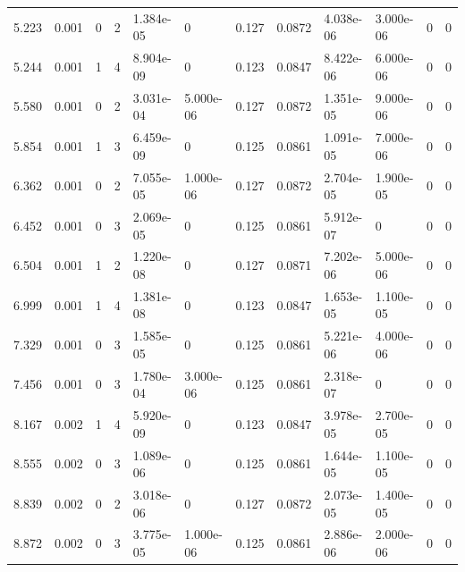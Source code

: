 \documentclass[preview]{standalone}
\begin{document}
{{\begin{tabular}{L{1.2cm}C{1.2cm} C{0.3cm}C{0.5cm} C{1.4cm}C{1.4cm} C{1.4cm}C{1.4cm} C{1.6cm}C{1.6cm} C{1.6cm}C{1.6cm}}
  5.223  &  0.001  & 0     &  2 &  1.384e-05  & 0  &  0.127&   0.0872& 4.038e-06 & 3.000e-06   &  0 & 0  \\ 
  5.244  &  0.001  & 1     &  4 &  8.904e-09  & 0  &  0.123&   0.0847& 8.422e-06 & 6.000e-06   &  0 & 0  \\ 
  5.580  &  0.001  & 0     &  2 &  3.031e-04  & 5.000e-06  &  0.127&   0.0872& 1.351e-05 & 9.000e-06   &  0 & 0  \\ 
  5.854  &  0.001  & 1     &  3 &  6.459e-09  & 0  &  0.125&   0.0861& 1.091e-05 & 7.000e-06   &  0 & 0  \\ 
  6.362  &  0.001  & 0     &  2 &  7.055e-05  & 1.000e-06  &  0.127&   0.0872& 2.704e-05 & 1.900e-05   &  0 & 0  \\ 
  6.452  &  0.001  & 0     &  3 &  2.069e-05  & 0  &  0.125&   0.0861& 5.912e-07 & 0   &  0 & 0  \\ 
  6.504  &  0.001  & 1     &  2 &  1.220e-08  & 0  &  0.127&   0.0871& 7.202e-06 & 5.000e-06   &  0 & 0  \\ 
  6.999  &  0.001  & 1     &  4 &  1.381e-08  & 0  &  0.123&   0.0847& 1.653e-05 & 1.100e-05   &  0 & 0  \\ 
  7.329  &  0.001  & 0     &  3 &  1.585e-05  & 0  &  0.125&   0.0861& 5.221e-06 & 4.000e-06   &  0 & 0  \\ 
  7.456  &  0.001  & 0     &  3 &  1.780e-04  & 3.000e-06  &  0.125&   0.0861& 2.318e-07 & 0   &  0 & 0  \\ 
  8.167  &  0.002  & 1     &  4 &  5.920e-09  & 0  &  0.123&   0.0847& 3.978e-05 & 2.700e-05   &  0 & 0  \\ 
  8.555  &  0.002  & 0     &  3 &  1.089e-06  & 0  &  0.125&   0.0861& 1.644e-05 & 1.100e-05   &  0 & 0  \\ 
  8.839  &  0.002  & 0     &  2 &  3.018e-06  & 0  &  0.127&   0.0872& 2.073e-05 & 1.400e-05   &  0 & 0  \\ 
  8.872  &  0.002  & 0     &  3 &  3.775e-05  & 1.000e-06  &  0.125&   0.0861& 2.886e-06 & 2.000e-06   &  0 & 0  \\ 
\hline 
\end{tabular} 

}}
\end{document}
